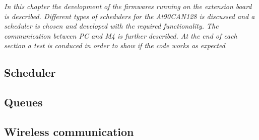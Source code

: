 \textit{In this chapter the development of the firmwares running on the extension board is described. Different types of schedulers for the At90CAN128 is discussed and a scheduler is chosen and developed with the required functionality. The communication between PC and M4 is further described. At the end of each section a test is conduced in order to show if the code works as expected }
\subsection{Scheduler}

\newpage

\subsection{Queues}

\newpage
%

\subsection{Wireless communication}


\newpage

